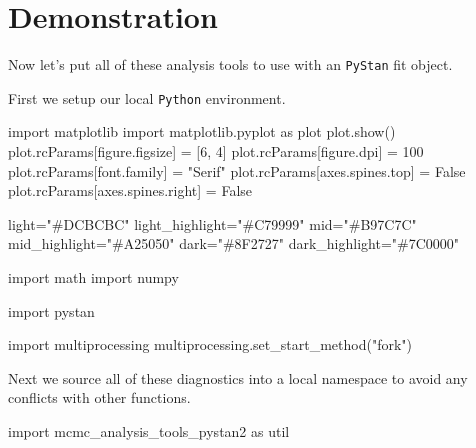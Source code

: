 \documentclass[
  letterpaper,
  DIV=11,
  numbers=noendperiod]{scrartcl}
\newenvironment{Shaded}{\begin{snugshade}}{\end{snugshade}}
\newcommand{\DecValTok}[1]{\textcolor[rgb]{0.68,0.00,0.00}{#1}}
\newcommand{\ImportTok}[1]{\textcolor[rgb]{0.00,0.46,0.62}{#1}}
\newcommand{\NormalTok}[1]{\textcolor[rgb]{0.00,0.23,0.31}{#1}}
\newcommand{\OperatorTok}[1]{\textcolor[rgb]{0.37,0.37,0.37}{#1}}
\newcommand{\StringTok}[1]{\textcolor[rgb]{0.13,0.47,0.30}{#1}}
\newcommand{\VariableTok}[1]{\textcolor[rgb]{0.07,0.07,0.07}{#1}}
\begin{document}
\section{Demonstration}\label{demonstration}

Now let's put all of these analysis tools to use with an \texttt{PyStan}
fit object.

First we setup our local \texttt{Python} environment.

\begin{Shaded}
\begin{Highlighting}[]
\ImportTok{import}\NormalTok{ matplotlib}
\ImportTok{import}\NormalTok{ matplotlib.pyplot }\ImportTok{as}\NormalTok{ plot}
\NormalTok{plot.show()}
\NormalTok{plot.rcParams[}\StringTok{\textquotesingle{}figure.figsize\textquotesingle{}}\NormalTok{] }\OperatorTok{=}\NormalTok{ [}\DecValTok{6}\NormalTok{, }\DecValTok{4}\NormalTok{]}
\NormalTok{plot.rcParams[}\StringTok{\textquotesingle{}figure.dpi\textquotesingle{}}\NormalTok{] }\OperatorTok{=} \DecValTok{100}
\NormalTok{plot.rcParams[}\StringTok{\textquotesingle{}font.family\textquotesingle{}}\NormalTok{] }\OperatorTok{=} \StringTok{"Serif"}
\NormalTok{plot.rcParams[}\StringTok{\textquotesingle{}axes.spines.top\textquotesingle{}}\NormalTok{] }\OperatorTok{=} \VariableTok{False}
\NormalTok{plot.rcParams[}\StringTok{\textquotesingle{}axes.spines.right\textquotesingle{}}\NormalTok{] }\OperatorTok{=} \VariableTok{False}

\NormalTok{light}\OperatorTok{=}\StringTok{"\#DCBCBC"}
\NormalTok{light\_highlight}\OperatorTok{=}\StringTok{"\#C79999"}
\NormalTok{mid}\OperatorTok{=}\StringTok{"\#B97C7C"}
\NormalTok{mid\_highlight}\OperatorTok{=}\StringTok{"\#A25050"}
\NormalTok{dark}\OperatorTok{=}\StringTok{"\#8F2727"}
\NormalTok{dark\_highlight}\OperatorTok{=}\StringTok{"\#7C0000"}

\ImportTok{import}\NormalTok{ math}
\ImportTok{import}\NormalTok{ numpy}

\ImportTok{import}\NormalTok{ pystan}

\ImportTok{import}\NormalTok{ multiprocessing}
\NormalTok{multiprocessing.set\_start\_method(}\StringTok{"fork"}\NormalTok{)}
\end{Highlighting}
\end{Shaded}

Next we source all of these diagnostics into a local namespace to avoid
any conflicts with other functions.

\begin{Shaded}
\begin{Highlighting}[]
\ImportTok{import}\NormalTok{ mcmc\_analysis\_tools\_pystan2 }\ImportTok{as}\NormalTok{ util}
\end{Highlighting}
\end{Shaded}
\end{document}
